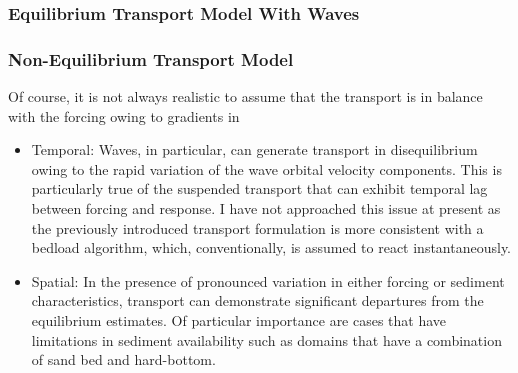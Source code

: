 \documentclass[aspectratio=169]{beamer}
\begin{document}
\begin{frame}
  \frametitle{Equilibrium Transport Model With Waves} 
  \centering
\end{frame}
\begin{frame}
  \frametitle{Non-Equilibrium Transport Model} Of course, it is not
  always realistic to assume that the transport is in balance with the
  forcing owing to gradients in
  \begin{itemize}
  \item Temporal: Waves, in particular, can generate transport in
    disequilibrium owing to the rapid variation of the wave orbital
    velocity components.  This is particularly true of the suspended
    transport that can exhibit temporal lag between forcing and
    response.  I have not approached this issue at present as the
    previously introduced transport formulation is more consistent
    with a bedload algorithm, which, conventionally, is assumed to
    react instantaneously.
  \item 
    Spatial: In the presence of pronounced variation in either forcing
    or sediment characteristics, transport can demonstrate significant
    departures from the equilibrium estimates.  Of particular
    importance are cases that have limitations in sediment
    availability such as domains that have a combination of sand bed
    and hard-bottom.
  \end{itemize}
\end{frame}
\end{document}
